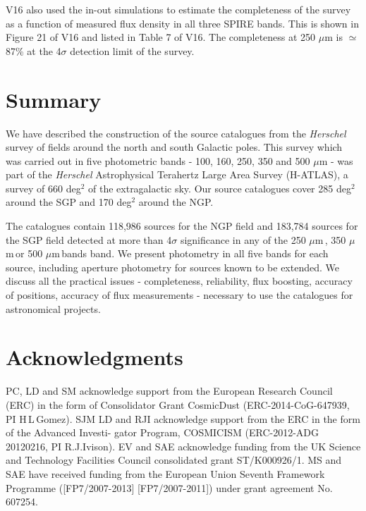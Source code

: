 \documentclass[useAMS,usenatbib]{mn2e}
\def\mic{ $\mu $m\,}
\begin{document}
V16 also used the in-out simulations to estimate the completeness of the survey as a function
of measured flux density in all three SPIRE bands. This is shown in Figure 21 of V16 and listed in
Table 7 of V16. The completeness at 250 $\mu$m is $\simeq$87\% at the
4$\sigma$ detection limit of the survey.



\section{Summary}

We have described the construction of the source catalogues from
the {\it Herschel} survey of fields 
around the north and south Galactic poles. This survey which was
carried out in five photometric bands - 100, 160, 250, 350 and 500 $\mu$m -
was part of the 
{\it Herschel} Astrophysical Terahertz Large Area Survey
(H-ATLAS), a survey of 660 deg$^2$ 
of the extragalactic sky. Our source catalogues
cover 
285 deg$^2$ around the SGP and 170 deg$^2$
around the NGP.

The catalogues contain
118,986 sources for the NGP field and 183,784 sources for the
SGP field detected at
more than 4$\sigma$ significance in any of the 250\mic, 350\mic or
500\mic bands band. We present photometry in all five bands for
each source, including aperture photometry for sources known to
be extended. We discuss all the practical issues - completeness, reliability,
flux boosting, accuracy of positions, accuracy of flux measurements - necessary to
use the catalogues for astronomical projects.

\section*{Acknowledgments}

PC, LD and SM acknowledge support from the European Research Council (ERC)
in the form of Consolidator Grant {\sc CosmicDust} (ERC-2014-CoG-647939, PI H\,L\,Gomez).
SJM LD and RJI acknowledge
support from the ERC in the form of the Advanced Investi-
gator Program,
COSMICISM
(ERC-2012-ADG
20120216,
PI  R.J.Ivison).
EV and SAE acknowledge funding
from the UK Science and Technology Facilities Council consolidated grant ST/K000926/1.
MS and SAE have received
funding from the European Union Seventh Framework Programme  ([FP7/2007-2013]
[FP7/2007-2011])  under  grant
agreement No. 607254.
\end{document}
